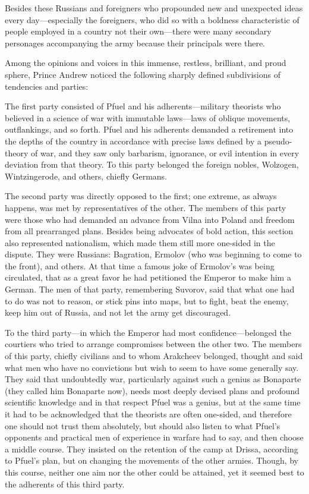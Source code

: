 Besides these Russians and foreigners who propounded new and
unexpected ideas every day---especially the foreigners, who did
so with a boldness characteristic of people employed in a country
not their own---there were many secondary personages accompanying
the army because their principals were there.

Among the opinions and voices in this immense, restless,
brilliant, and proud sphere, Prince Andrew noticed the following
sharply defined subdivisions of tendencies and parties:

The first party consisted of Pfuel and his adherents---military
theorists who believed in a science of war with immutable
laws---laws of oblique movements, outflankings, and so
forth. Pfuel and his adherents demanded a retirement into the
depths of the country in accordance with precise laws defined by
a pseudo-theory of war, and they saw only barbarism, ignorance,
or evil intention in every deviation from that theory. To this
party belonged the foreign nobles, Wolzogen, Wintzingerode, and
others, chiefly Germans.

The second party was directly opposed to the first; one extreme,
as always happens, was met by representatives of the other. The
members of this party were those who had demanded an advance from
Vilna into Poland and freedom from all prearranged plans. Besides
being advocates of bold action, this section also represented
nationalism, which made them still more one-sided in the
dispute. They were Russians: Bagration, Ermolov (who was
beginning to come to the front), and others. At that time a
famous joke of Ermolov's was being circulated, that as a great
favor he had petitioned the Emperor to make him a German. The men
of that party, remembering Suvorov, said that what one had to do
was not to reason, or stick pins into maps, but to fight, beat
the enemy, keep him out of Russia, and not let the army get
discouraged.

To the third party---in which the Emperor had most
confidence---belonged the courtiers who tried to arrange
compromises between the other two.  The members of this party,
chiefly civilians and to whom Arakcheev belonged, thought and
said what men who have no convictions but wish to seem to have
some generally say. They said that undoubtedly war, particularly
against such a genius as Bonaparte (they called him Bonaparte
now), needs most deeply devised plans and profound scientific
knowledge and in that respect Pfuel was a genius, but at the same
time it had to be acknowledged that the theorists are often
one-sided, and therefore one should not trust them absolutely,
but should also listen to what Pfuel's opponents and practical
men of experience in warfare had to say, and then choose a middle
course. They insisted on the retention of the camp at Drissa,
according to Pfuel's plan, but on changing the movements of the
other armies. Though, by this course, neither one aim nor the
other could be attained, yet it seemed best to the adherents of
this third party.

